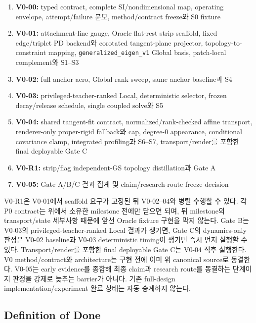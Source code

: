 \documentclass[11pt]{article}
\begin{document}
\begin{enumerate}
  \item \textbf{V0-00:} typed contract, complete SI/nondimensional map,
  operating envelope, attempt/failure 분모, method/contract freeze와 S0 fixture
  \item \textbf{V0-01:} attachment-line gauge, Oracle flat-rest strip scaffold,
  fixed edge/triplet PD backend와 corotated tangent-plane projector,
  topology-to-constraint mapping, \texttt{generalized\_eigen\_v1} Global basis,
  patch-local complement와 S1--S3
  \item \textbf{V0-02:} full-anchor aero, Global rank sweep, same-anchor baseline과 S4
  \item \textbf{V0-03:} privileged-teacher-ranked Local, deterministic selector,
  frozen decay/release schedule,
  single coupled solve와 S5
  \item \textbf{V0-04:} shared tangent-fit contract,\newline
  normalized/rank-checked affine transport,
  renderer-only proper-rigid fallback와 cap, degree-0 appearance,
  conditional covariance clamp,
  integrated profiling과 S6--S7, transport/render를 포함한 final deployable Gate C
  \item \textbf{V0-R1:} strip/flag independent-GS topology distillation과 Gate A
  \item \textbf{V0-05:} Gate A/B/C 결과 집계 및 claim/research-route freeze decision
\end{enumerate}

V0-R1은 V0-01에서 scaffold 요구가 고정된 뒤 V0-02--04와 병렬 수행할 수 있다.
각 P0 contract는 위에서 소유한 milestone 전에만 닫으면 되며,
뒤 milestone의 transport/state 세부사항 때문에 앞선 Oracle fixture 구현을 막지 않는다.
Gate B는 V0-03의 privileged-teacher-ranked Local 결과가 생기면,
Gate C의 dynamics-only 판정은 V0-02 baseline과
V0-03 deterministic timing이 생기면 즉시 먼저 실행할 수 있다.
Transport/render를 포함한 final deployable Gate C는 V0-04 직후 실행한다.
V0 method/contract와 architecture는 구현 전에 이미 위 canonical source로 동결한다.
V0-05는 early evidence를 종합해 최종 claim과 research route를 동결하는 단계이지
판정을 강제로 늦추는 barrier가 아니다.
기존 full-design implementation/experiment 완료 상태는 자동 승계하지 않는다.

\subsection{Definition of Done}
\end{document}
